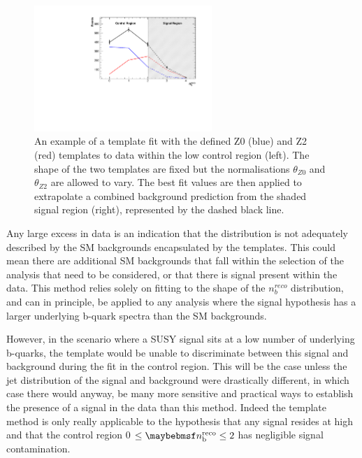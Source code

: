  \begin{figure}[!h]
 \centering
\includegraphics[width=0.60\textwidth]{plots/Template_Example.pdf}
\caption[An example of a template fit with the defined Z0 (blue) and Z2 (red) templates to data within the low \nbreco control region (left).]{An example of a template fit with the defined Z0 (blue) and Z2 (red) templates to data within the low \nbreco control region (left). The shape of the two templates are fixed but the normalisations $\theta_{Z0}$ and $\theta_{Z2}$ are allowed to vary. The best fit values are then applied to extrapolate a combined background prediction from the shaded signal region (right), represented by the dashed black line.}  
\label{fig:templateexample}
\end{figure}

Any large excess in data is an indication that the \nbreco distribution is not adequately described by the \ac{SM} backgrounds encapsulated by the templates. This could mean there are additional \ac{SM} backgrounds that fall within the selection of the analysis that need to be considered, or that there is signal present within the data. This method relies solely on fitting to the shape of the $n_{b}^{reco}$ distribution, and can in principle, be applied to any analysis where the signal hypothesis has a larger underlying b-quark spectra than the \ac{SM} backgrounds. 

However, in the scenario where a \ac{SUSY} signal sits at a low number of underlying b-quarks, the template would be unable to discriminate between this signal and background during the fit in the control region. This will be the case unless the jet \pt distribution of the signal and background were drastically different, in which case there would anyway, be many more sensitive and practical ways to establish the presence of a signal in the data than this method. Indeed the template method is only really applicable to the hypothesis that any signal resides at high \nbreco and that the control region 0 $\leq \nbreco \leq 2$ has negligible signal contamination.  

